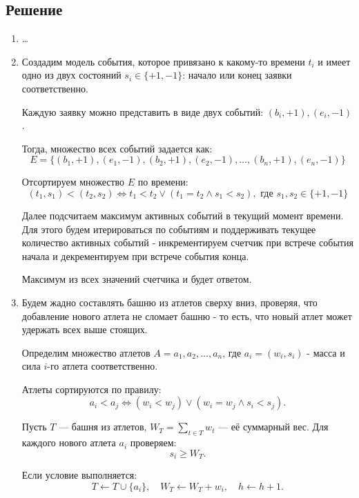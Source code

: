 \subsection{Решение}

\begin{enumerate}

\item \dots

\item

    Создадим модель события, которое привязано к какому-то времени $t_i$ и имеет одно из двух состояний
    $s_i \in \{+1, -1\}$: начало или конец заявки соответственно.

    Каждую заявку можно представить в виде двух событий: \( (b_i, +1), (e_i, -1) \).

    Тогда, множество всех событий задается как:
    \[
        E = \{ (b_1, +1), (e_1, -1), (b_2, +1), (e_2, -1), \dots, (b_n, +1), (e_n, -1) \}
    \]

    Отсортируем множество $E$ по времени:
    \[
       (t_1, s_1) < (t_2, s_2) \iff t_1 < t_2 \lor (t_1 = t_2 \land s_1 < s_2), \text{ где } s_1, s_2 \in \{+1, -1\}
    \]

    Далее подсчитаем максимум активных событий в текущий момент времени.
    Для этого будем итерироваться по событиям и поддерживать текущее количество активных
    событий - инкрементируем счетчик при встрече события начала и декрементируем при
    встрече события конца.

    Максимум из всех значений счетчика и будет ответом.

\item

    Будем жадно составлять башню из атлетов сверху вниз, проверяя, что добавление
    нового атлета не сломает башню - то есть, что новый атлет может удержать всех
    выше стоящих.

    Определим множество атлетов $A = {a_1, a_2, \dots, a_n}$, где $a_i = (w_i, s_i)$ - масса и сила
    $i$-го атлета соответственно.

    Атлеты сортируются по правилу:
    \[
        a_i < a_j \iff (w_i < w_j) \lor (w_i = w_j \land s_i < s_j).
    \]

    Пусть \( T \) — башня из атлетов, \( W_T = \sum_{t \in T} w_t \) — её суммарный вес.
    Для каждого нового атлета \( a_i \) проверяем:
    \[
        s_i \geq W_T.
    \]

    Если условие выполняется:
    \[
        T \gets T \cup \{a_i\}, \quad W_T \gets W_T + w_i, \quad h \gets h + 1.
    \]


\end{enumerate}
